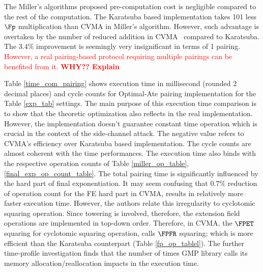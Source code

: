 The Miller's algorithms proposed pre-computation cost is negligible compared to the rest of the computation.
The Karatsuba based implementation takes 101 less $\Fp$ multiplication than CVMA in Miller's algorithm.
However, such advantage is overtaken by the number of reduced addition in CVMA~ compared to Karatsuba.
The $3.4\%$ improvement is seemingly very insignificant in terms of 1 pairing. 
 \textcolor{red}{However, a real pairing-based protocol requiring multiple pairings can be benefited from it. \textbf{WHY?? Explain}}

Table \ref{time_com_pairing} shows  execution time in millisecond (rounded 2 decimal places) and cycle counts for Optimal-Ate pairing implementation for the Table \ref{exp_tab} settings. 
The main purpose of this execution time comparison is to show that the theoretic optimization also reflects in the real implementation.
However, the implementation doesn't guarantee constant time operation which is crucial in the context of the side-channel attack.
The negative value refers to CVMA's efficiency over Karatsuba based implementation. 
The cycle counts are almost coherent with the time performances.
The execution time  also binds with the respective operation counts of Table \ref{miller_op_table}, \ref{final_exp_op_count_table}.
The total pairing time is significantly influenced by the hard part of final exponentiation. 
It may seem confusing that $0.7\%$ reduction of operation count for the FE hard part in CVMA, results in  relatively more faster execution time.
However, the authors relate this irregularity to cyclotomic squaring operation.
Since towering is involved, therefore, the extension field operations are implemented in top-down order.
Therefore, in CVMA, the $\FPET$ squaring for cyclotomic squaring operation, calls $\FPFR$ squaring; which is more efficient than the Karatsuba counterpart (Table \ref{fp_op_tablel}).
The further time-profile investigation finds that  the number of times GMP library calls its  memory allocation/reallocation impacts in the execution time.


